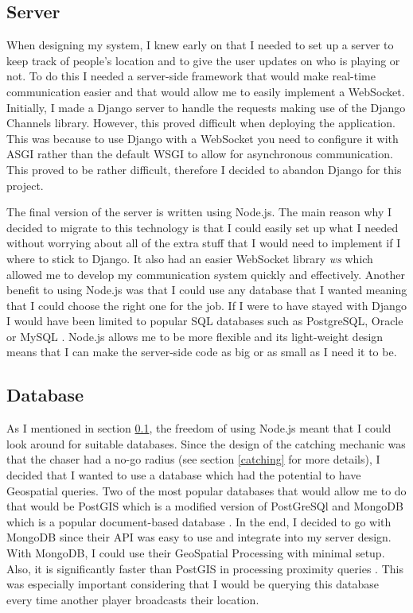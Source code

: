 \documentclass{l4proj}
\begin{document}
\subsection{Server}
\label{implementationServer}
When designing my system, I knew early on that I needed to set up a server to keep track of people's location
and to give the user updates on who is playing or not. To do this I needed a server-side framework that would make real-time communication easier and that would allow me to easily implement a WebSocket. Initially, I made a Django server to
handle the requests making use of the Django Channels library. However, this proved difficult when deploying the application.
This was because to use Django with a WebSocket you need to configure it with ASGI rather than the default WSGI
to allow for asynchronous communication. This proved to be rather difficult, therefore I decided to abandon Django for this
project.

The final version of the server is written using Node.js. The main reason why I decided to migrate to this technology is that
I could easily set up what I needed without worrying about all of the extra stuff that I would need to implement if I where to
stick to Django. It also had an easier WebSocket library \emph{ws} which allowed me to develop my communication system quickly
and effectively. Another benefit to using Node.js was that I could use any database that I wanted meaning that I could
choose the right one for the job. If I were to have stayed with Django I would have been limited to popular SQL databases
such as PostgreSQL, Oracle or MySQL \citep{djangoDatabases}. Node.js allows me to be more flexible and its light-weight
design means that I can make the server-side code as big or as small as I need it to be.

\subsection{Database}
\label{implementationDatabase}
As I mentioned in section \ref{implementationServer}, the freedom of using Node.js meant that I could look
around for suitable databases. Since the design of the catching mechanic was that the chaser had a no-go radius (see section
\ref{catching} for more details), I decided that I wanted to use a database which had the potential to have Geospatial queries.
Two of the most popular databases that would allow me to do that would be PostGIS which is a modified version of PostGreSQl \citep{postgis, postgres} and
MongoDB which is a popular document-based database \citep{mongodb}. In the end, I decided to go with MongoDB since their API
was easy to use and integrate into my server design. With MongoDB, I could use their GeoSpatial Processing with minimal setup. Also, it is significantly
faster than PostGIS in processing proximity queries \citep{Bartoszewski2019}. This was especially important considering
that I would be querying this database every time another player broadcasts their location.
\end{document}
